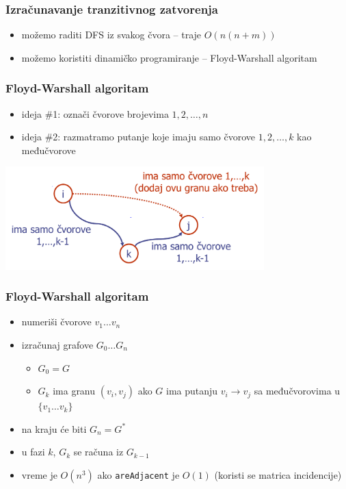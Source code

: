 \documentclass[compress,aspectratio=169]{beamer}
\begin{document}
\begin{frame}[fragile]
  \frametitle{Izračunavanje tranzitivnog zatvorenja}
  \begin{itemize}
    \item možemo raditi DFS iz svakog čvora -- traje $O(n(n+m))$
    \item možemo koristiti dinamičko programiranje -- Floyd-Warshall 
      algoritam
  \end{itemize}
\end{frame}

\begin{frame}[fragile]
  \frametitle{Floyd-Warshall algoritam}
  \begin{itemize}
    \item ideja \#1: označi čvorove brojevima $1, 2, \ldots, n$
    \item ideja \#2: razmatramo putanje koje imaju samo čvorove $1, 2, 
      \ldots, k$ kao međučvorove
  \end{itemize}
  \begin{center}
    \includegraphics[width=10cm]{asp-14-pic36.png}
  \end{center}
\end{frame}

\begin{frame}[fragile]
  \frametitle{Floyd-Warshall algoritam}
  \begin{itemize}
    \item numeriši čvorove $v_1 \ldots v_n$
    \item izračunaj grafove $G_0 \ldots G_n$ 
    \begin{itemize}
      \item $G_0 = G$
      \item $G_k$ ima granu $(v_{i},v_{j})$ ako $G$ ima putanju 
        $v_{i}\rightarrow v_{j}$ sa međučvorovima u $\{v_{1}\ldots 
        v_{k}\}$
    \end{itemize}
    \item na kraju će biti $G_{n} = G^{*}$
    \item u fazi $k$, $G_{k}$ se računa iz $G_{k-1}$
    \item vreme je $O(n^3)$ ako \texttt{areAdjacent} je $O(1)$
      (koristi se matrica incidencije)
  \end{itemize}
\end{frame}
\end{document}
